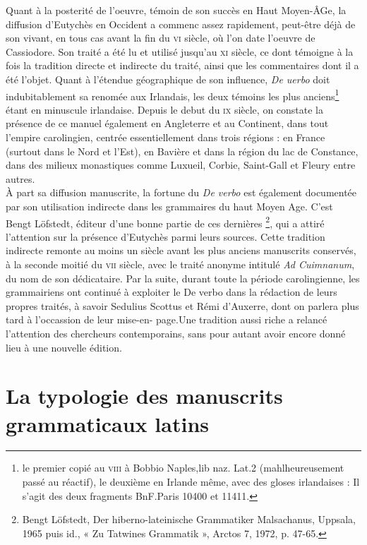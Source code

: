 \documentclass[a4paper, twoside, 12pt]{book}
\begin{document}
Quant à la posterité de l'oeuvre, témoin de son succès en Haut Moyen-ÂGe, la diffusion d’Eutychès en Occident a commenc assez rapidement, peut-être déjà de son vivant, en tous cas avant la fin du \textsc{vi}\ieme{} siècle, où l'on date l'oeuvre de Cassiodore. Son traité a été lu et utilisé jusqu’au \textsc{xi}\ieme{} siècle, ce dont témoigne à la fois la tradition directe et indirecte du traité, ainsi que les commentaires dont il a été l’objet. Quant à l'étendue géographique de son influence, \textit{De uerbo} doit indubitablement sa renomée aux Irlandais, les deux témoins les plus anciens\footnote{le  premier  copié  au \textsc{viii}\ieme{} à  Bobbio  Naples,lib naz. Lat.2 (mahlheureusement passé au réactif),  le  deuxième  en  Irlande même,  avec  des gloses  irlandaises : Il s'agit des deux fragments BnF.Paris 10400  et 11411.} étant en minuscule irlandaise. Depuis le debut du \textsc{ix}\ieme{} siècle, on  constate la présence de ce manuel également en Angleterre et au Continent, dans tout l'empire carolingien, centrée essentiellement dans trois régions : en France (surtout dans le Nord et l'Est), en Bavière et dans la région  du lac de Constance, dans des milieux monastiques comme Luxueil, Corbie, Saint-Gall et Fleury entre autres.\\

À part sa diffusion manuscrite, la fortune du \textit{De verbo} est également documentée par son utilisation indirecte dans les grammaires du haut Moyen Age. C’est Bengt Löfstedt, éditeur d’une bonne partie de ces dernières \footnote{Bengt Löfstedt, Der hiberno-lateinische Grammatiker Malsachanus, Uppsala, 1965 puis id., « Zu Tatwines Grammatik », Arctos 7, 1972, p. 47-65.}, qui a attiré l’attention sur la présence d’Eutychès parmi leurs sources. Cette tradition indirecte remonte au moins un siècle avant les plus anciens manuscrits conservés, à la seconde moitié du  \textsc{vii}\ieme{} siècle, avec le traité anonyme intitulé \textit{Ad Cuimnanum}, du nom de son dédicataire. Par la suite, durant toute la période carolingienne, les grammairiens ont continué à exploiter le De verbo dans la rédaction de leurs propres traités, à savoir Sedulius Scottus et Rémi d'Auxerre, dont on parlera plus tard à l'occassion de leur mise-en- page.Une tradition aussi riche a relancé l'attention des chercheurs contemporains, sans pour autant avoir encore donné lieu à une nouvelle édition.



\section{La typologie des manuscrits grammaticaux latins}
\end{document}
